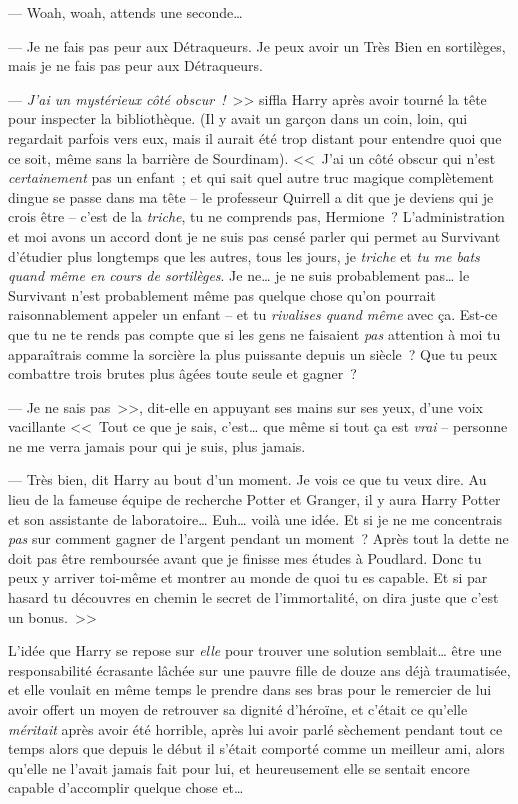 --- Woah, woah, attends une seconde…

--- Je ne fais pas peur aux Détraqueurs. Je peux avoir un Très Bien en sortilèges, mais je ne fais pas peur aux Détraqueurs.

--- \emph{J'ai un mystérieux côté obscur~!}~>> siffla Harry après avoir tourné la tête pour inspecter la bibliothèque. (Il y avait un garçon dans un coin, loin, qui regardait parfois vers eux, mais il aurait été trop distant pour entendre quoi que ce soit, même sans la barrière de Sourdinam). <<~J'ai un côté obscur qui n'est \emph{certainement} pas un enfant~; et qui sait quel autre truc magique complètement dingue se passe dans ma tête -- le professeur Quirrell a dit que je deviens qui je crois être -- c'est de la \emph{triche}, tu ne comprends pas, Hermione~? L'administration et moi avons un accord dont je ne suis pas censé parler qui permet au Survivant d'étudier plus longtemps que les autres, tous les jours, je \emph{triche} et \emph{tu me bats quand même en cours de sortilèges}. Je ne… je ne suis probablement pas… le Survivant n'est probablement même pas quelque chose qu'on pourrait raisonnablement appeler un enfant -- et tu \emph{rivalises quand même} avec ça. Est-ce que tu ne te rends pas compte que si les gens ne faisaient \emph{pas} attention à moi tu apparaîtrais comme la sorcière la plus puissante depuis un siècle~? Que tu peux combattre trois brutes plus âgées toute seule et gagner~?

--- Je ne sais pas~>>, dit-elle en appuyant ses mains sur ses yeux, d'une voix vacillante <<~Tout ce que je sais, c'est… que même si tout ça est \emph{vrai} -- personne ne me verra jamais pour qui je suis, plus jamais.

--- Très bien, dit Harry au bout d'un moment. Je vois ce que tu veux dire. Au lieu de la fameuse équipe de recherche Potter et Granger, il y aura Harry Potter et son assistante de laboratoire… Euh… voilà une idée. Et si je ne me concentrais \emph{pas} sur comment gagner de l'argent pendant un moment~? Après tout la dette ne doit pas être remboursée avant que je finisse mes études à Poudlard. Donc tu peux y arriver toi-même et montrer au monde de quoi tu es capable. Et si par hasard tu découvres en chemin le secret de l'immortalité, on dira juste que c'est un bonus.~>>

L'idée que Harry se repose sur \emph{elle} pour trouver une solution semblait… être une responsabilité écrasante lâchée sur une pauvre fille de douze ans déjà traumatisée, et elle voulait en même temps le prendre dans ses bras pour le remercier de lui avoir offert un moyen de retrouver sa dignité d'héroïne, et c'était ce qu'elle \emph{méritait} après avoir été horrible, après lui avoir parlé sèchement pendant tout ce temps alors que depuis le début il s'était comporté comme un meilleur ami, alors qu'elle ne l'avait jamais fait pour lui, et heureusement elle se sentait encore capable d'accomplir quelque chose et…

